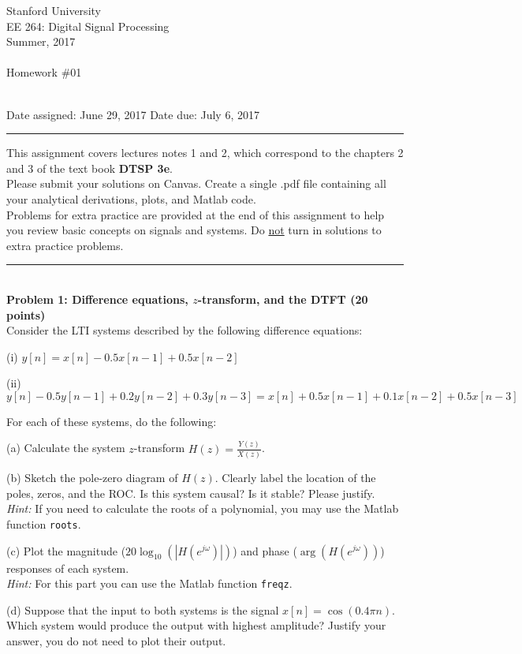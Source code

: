 \documentclass[12pt]{report}
\begin{document}
\thispagestyle{empty}
\begin{centering}
{\large Stanford University}\\
{\large EE 264: Digital Signal Processing}\\
{\large Summer, 2017} \\
\mbox{}\\
{\large Homework \#01}\\
\mbox{}\\
\end{centering}
\noindent Date assigned:  June 29, 2017 \hfill
Date due: July 6, 2017\\
\noindent \rule{6.5 in}{0.5pt}
  This assignment covers lectures notes 1 and 2, which correspond to the chapters 2 and 3 of the text book {\bf DTSP 3e}. \\
  Please submit your solutions on Canvas. Create a single .pdf file containing all your analytical derivations, plots, and Matlab code. \\
  Problems for extra practice are provided at the end of this assignment to help you review basic concepts on signals and systems. Do \underline{not} turn in solutions to extra practice problems.

\noindent
\rule{6.5 in}{0.5pt}
\mbox{}\\
\noindent
{\bf Problem 1: Difference equations, $z$-transform, and the DTFT (20 points)} \\
Consider the LTI systems described by the following difference equations:

\begin{description}
	\item{(i)} $y[n] = x[n] - 0.5x[n-1] + 0.5x[n-2]$
	\item{(ii)} $y[n] - 0.5y[n-1] + 0.2y[n-2] + 0.3y[n-3] = x[n] + 0.5x[n-1] + 0.1x[n-2] + 0.5x[n-3]$
\end{description}
\noindent
For each of these systems, do the following:
\begin{description}
	\item{(a)} Calculate the system $z$-transform $H(z) = \frac{Y(z)}{X(z)}$.
	\item{(b)} Sketch the pole-zero diagram of $H(z)$. Clearly label the location of the poles, zeros, and the ROC. Is this system causal? Is it stable? Please justify.\\
	\textit{Hint:} If you need to calculate the roots of a polynomial, you may use the Matlab function \texttt{roots}.
	\item{(c)} Plot the magnitude ($20\log_{10}(|H(e^{j\omega})|)$) and phase ($\arg(H(e^{j\omega}))$) responses of each system. \\
	\textit{Hint:} For this part you can use the Matlab function \texttt{freqz}.
	\item {(d)} Suppose that the input to both systems is the signal $x[n] = \cos(0.4\pi n)$. Which system would produce the output with highest amplitude? Justify your answer, you do not need to plot their output.
\end{description}
\end{document}
